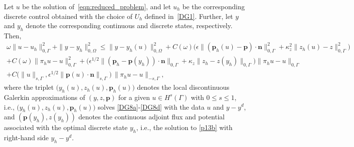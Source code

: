 \documentclass[10pt,a4paper]{amsart}
\newcommand{\bn}{{\mathbf{n}}}
\newcommand{\bp}{{\mathbf{p}}}
\newcommand{\x}[2][blue]{#2}
\begin{document}
\begin{theorem}\label{thm:fully-discrete}
Let $u$ be the solution of~\eqref{eqn:reduced_problem}, and let
$u_h$ be the corresponding discrete control obtained with the choice of $U_h$ defined in~\eqref{DG1}.
Further, let $y$ and $y_h$ denote the corresponding \x{continuous and discrete states}, respectively. 
Then, 
\begin{multline}\label{gge}
    \omega \| u - u_h \|_{0,\Gamma}^2  + \|y-y_h\|_{0,\Omega}^2 \le \|y-y_h(u)\|_{0,\Omega}^2 + C(\omega) 
     \big( \epsilon\|(\bp_h(u) - \bp)\cdot \bn\|_{0,\Gamma}^2 
         + \kappa_z^2\|z_h(u) - z\|_{0,\Gamma}^2 \big)  \\ + C(\omega) \|\pi_hu-u\|_{0,\Gamma}^2 + \big(\epsilon^{1/2}\|(\bp_h - \bp(y_h))\cdot \bn\|_{0,\Gamma}+ \kappa_z\|z_h - z(y_h)\|_{0,\Gamma}\big)\|\pi_hu-u\|_{0,\Gamma}  \\ + C \big(\|u\|_{s,\Gamma}, \epsilon^{1/2}\|\bp(u)\cdot\bn\|_{s,\Gamma}\big)\,
       \|\pi_h u - u\|_{-s,\Gamma},
\end{multline}
where the triplet $\big(y_h(u), z_h(u),\bp_h(u)\big)$ denotes the local discontinuous Galerkin approximations of $(y,z,\bp)$ for a given $u\in H^s(\Gamma)$  with $0\le s\le 1$, i.e., $\big(y_h(u), z_h(u),\bp_h(u)\big)$ solves \eqref{DG8a}-\eqref{DG8d} with the data $u$ and $y-y^d$, and $(\bp(y_h),z(y_h))$ denotes the continuous adjoint flux and potential associated with the optimal discrete state $y_h$, i.e., the solution to \eqref{p13b} with right-hand side $y_h-y^d$.
\end{theorem}
\end{document}
